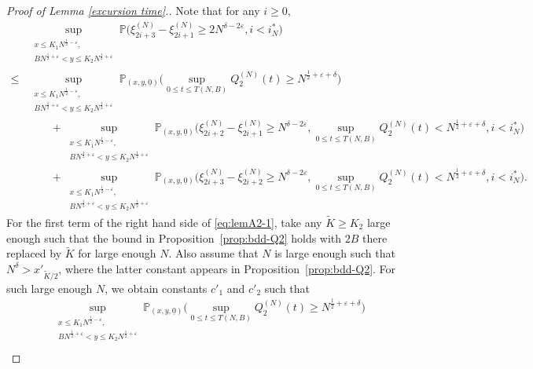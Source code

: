 \documentclass[11pt, reqno]{article}
\numberwithin{equation}{section}
\numberwithin{theorem}{section}
\begin{document}
\begin{appendix}
\begin{proof}[Proof of Lemma \ref{excursion time}.]
Note that for any $i \ge 0$,
\begin{equation}\label{eq:lemA2-1}
    \begin{split}
        &\sup_{\substack{x\leq K_1N^{\frac{1}{2} - \varepsilon},\\ BN^{\frac{1}{2} + \varepsilon} <y\leq K_2N^{\frac{1}{2} + \varepsilon}}}\mathbb{P}\Big(\xi^{(N)}_{2i+3}-\xi^{(N)}_{2i+1}\geq 2N^{\delta-2\varepsilon}, i <i^*_N\Big)\\
    \leq & \sup_{\substack{x\leq K_1N^{\frac{1}{2} - \varepsilon},\\ BN^{\frac{1}{2} + \varepsilon} <y\leq K_2N^{\frac{1}{2} + \varepsilon}}}\mathbb{P}_{(x,y,\underline{0})}\Big(\sup_{0\leq t\leq T(N,B)} Q^{(N)}_2(t)\geq N^{\frac{1}{2}+\varepsilon+\delta}\Big)\\
    &\qquad+\sup_{\substack{x\leq K_1N^{\frac{1}{2} - \varepsilon},\\ BN^{\frac{1}{2} + \varepsilon} <y\leq K_2N^{\frac{1}{2} + \varepsilon}}}\mathbb{P}_{(x,y,\underline{0})}\Big(\xi^{(N)}_{2i+2}-\xi^{(N)}_{2i+1}\geq N^{\delta-2\varepsilon}, \sup_{0\leq t\leq T(N,B)} Q^{(N)}_2(t)< N^{\frac{1}{2}+\varepsilon+\delta}, i <i^*_N\Big)\\
    &\qquad+\sup_{\substack{x\leq K_1N^{\frac{1}{2} - \varepsilon},\\ BN^{\frac{1}{2} + \varepsilon} <y\leq K_2N^{\frac{1}{2} + \varepsilon}}}\mathbb{P}_{(x,y,\underline{0})}\Big(\xi^{(N)}_{2i+3}-\xi^{(N)}_{2i+2}\geq N^{\delta-2\varepsilon}, \sup_{0\leq t\leq T(N,B)} Q^{(N)}_2(t)< N^{\frac{1}{2}+\varepsilon+\delta}, i <i^*_N\Big).
    \end{split}
\end{equation}
For the first term of the right hand side of \eqref{eq:lemA2-1}, take any $\tilde{K} \ge K_2$ large enough such that the bound in Proposition~\ref{prop:bdd-Q2} holds with $2B$ there replaced by $\tilde{K}$ for large enough $N$. Also assume that $N$ is large enough such that $N^{\delta}> x'_{\tilde{K}/2}$, where the latter constant appears in Proposition~\ref{prop:bdd-Q2}. For such large enough $N$, we obtain constants $c'_1$ and $c'_2$ such that
\begin{align}\label{eq:lemA2-2}
    &\sup_{\substack{x\leq K_1N^{\frac{1}{2} - \varepsilon},\\ BN^{\frac{1}{2} + \varepsilon} <y\leq K_2N^{\frac{1}{2} + \varepsilon}}}\mathbb{P}_{(x,y,\underline{0})}\Big(\sup_{0\leq t\leq T(N,B)} Q^{(N)}_2(t)\geq N^{\frac{1}{2}+\varepsilon+\delta}\Big)\nonumber\\

\end{align}
\end{proof}
\end{appendix}
\end{document}
